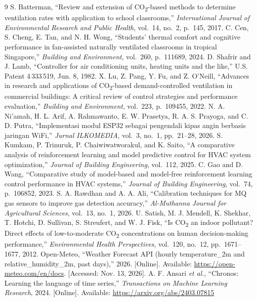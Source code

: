 \documentclass[10pt,a4paper]{article}
\begin{document}
\renewcommand{\refname}{9.\enspace Referencias bibliográficas}
\begin{thebibliography}{9}\small
{} S. Batterman, ``Review and extension of CO\textsubscript{2}-based methods to determine ventilation rates with application to school classrooms,'' \emph{International Journal of Environmental Research and Public Health}, vol.~14, no.~2, p.~145, 2017.
 C. Cen, S. Cheng, E. Tan, and N. H. Wong, ``Students' thermal comfort and cognitive performance in fan-assisted naturally ventilated classrooms in tropical Singapore,'' \emph{Building and Environment}, vol.~260, p.~111689, 2024.
 D. Shafrir and J. Lamb, ``Controller for air conditioning units, heating units and the like,'' U.S. Patent 4\,333\,519, Jun. 8, 1982.
 X. Lu, Z. Pang, Y. Fu, and Z. O'Neill, ``Advances in research and applications of CO\textsubscript{2}-based demand-controlled ventilation in commercial buildings: A critical review of control strategies and performance evaluation,'' \emph{Building and Environment}, vol.~223, p.~109455, 2022.
 N. A. Ni'amah, H. L. Arif, A. Rahmawanto, E. W. Prasetya, R. A. S. Prayoga, and C. D. Putra, ``Implementasi modul ESP32 sebagai pengendali kipas angin berbasis jaringan WiFi,'' \emph{Jurnal ILKOMEDIA}, vol.~3, no.~1, pp.~21--28, 2026.
 S. Kumkam, P. Trinuruk, P. Chaiwiwatworakul, and K. Saito, ``A comparative analysis of reinforcement learning and model predictive control for HVAC system optimization,'' \emph{Journal of Building Engineering}, vol.~112, 2025.
 C. Gao and D. Wang, ``Comparative study of model-based and model-free reinforcement learning control performance in HVAC systems,'' \emph{Journal of Building Engineering}, vol.~74, p.~106852, 2023.
 S. A. Rawdhan and A. A. Ali, ``Calibration techniques for MQ gas sensors to improve gas detection accuracy,'' \emph{Al-Muthanna Journal for Agricultural Sciences}, vol.~13, no.~1, 2026.
 U. Satish, M. J. Mendell, K. Shekhar, T. Hotchi, D. Sullivan, S. Streufert, and W. J. Fisk, ``Is CO\textsubscript{2} an indoor pollutant? Direct effects of low-to-moderate CO\textsubscript{2} concentrations on human decision-making performance,'' \emph{Environmental Health Perspectives}, vol.~120, no.~12, pp.~1671--1677, 2012.
 Open-Meteo, ``Weather Forecast API (hourly temperature\_2m and relative\_humidity\_2m, past days),'' 2026. [Online]. Available: \url{https://open-meteo.com/en/docs}. [Accessed: Nov. 13, 2026].
 A. F. Ansari \emph{et al.}, ``Chronos: Learning the language of time series,'' \emph{Transactions on Machine Learning Research}, 2024. [Online]. Available: \url{https://arxiv.org/abs/2403.07815}
\end{thebibliography}
\end{document}
